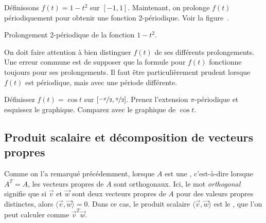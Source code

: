 \begin{example}
Définissons  $f(t) = 1-t^2$ sur $[-1,1]$.  Maintenant, on prolonge $f(t)$ périodiquement pour obtenir une fonction 2-périodique.  Voir la figure~.
\begin{myfig}
\capstart
{}
\caption{Prolongement 2-périodique de la fonction 
$1-t^2$.\label{ts:perextofinvertedparabolafig}}
\end{myfig}
\end{example}

On doit faire attention à bien distinguer $f(t)$ de ses différents prolongements.  Une erreur commune est de supposer que la formule pour $f(t)$ fonctionne toujours pour ses prolongements. Il faut être particulièrement prudent lorsque $f(t)$ est périodique, mais avec une période différente.

\begin{exercise}
Définissez $f(t) = \cos t$ sur $[\nicefrac{-\pi}{2},\nicefrac{\pi}{2}]$.  Prenez l'extension $\pi$-périodique et esquissez le graphique. Comparez avec le graphique de $\cos t$.
\end{exercise}

\subsection{Produit scalaire et décomposition de vecteurs propres }

Comme on l'a remarqué précédemment, lorsque $A$ est une \emph{},
c'est-à-dire lorsque $A^T = A$, les vecteurs propres de $A$ sont orthogonaux. Ici, le mot 
\emph{orthogonal} signifie que si $\vec{v}$ et $\vec{w}$ sont deux vecteurs propres de $A$ pour des valeurs propres distinctes, alors $\langle \vec{v} , \vec{w} \rangle = 0$.
Dans ce cas, le produit scalaire  $\langle \vec{v} , \vec{w} \rangle$
est le \emph{}, que l'on peut calculer comme $\vec{v}^T\vec{w}$.

